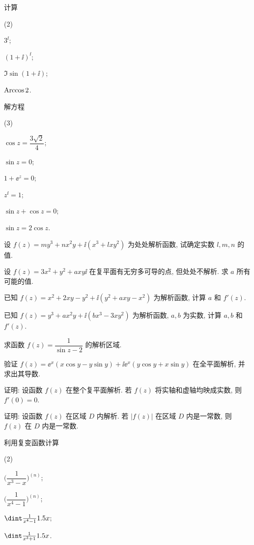 \begin{homework}
\begin{homework}
    \item 计算
      \begin{subhomework}(2)
        \item $3^\ii$;
        \item $(1+\ii)^\ii$;
        \item $\Im\sin(1+\ii)$;
        \item $\operatorname{Arccos} 2$.
      \end{subhomework}
    \item 解方程 
      \begin{subhomework}(3)
        \item $\cos z=\dfrac{3\sqrt2}4$;
        \item $\sin z=0$;
        \item $1+\ee^z=0$;
        \item $z^\ii=1$;
        \item $\sin z+\cos z=0$;
        \item $\sin z=2\cos z$.
      \end{subhomework}
    \item 设 $f(z)=my^3+nx^2y+\ii(x^3+lxy^2)$ 为处处解析函数, 试确定实数 $l,m,n$ 的值.
    \item 设 $f(z)=3x^2+y^2+axy\ii$ 在复平面有无穷多可导的点, 但处处不解析. 求 $a$ 所有可能的值.
    \item 已知 $f(z)=x^2+2xy-y^2+\ii(y^2+axy-x^2)$ 为解析函数, 计算 $a$ 和 $f'(z)$.
    \item 已知 $f(z)=y^3+ax^2y+\ii(bx^3-3xy^2)$ 为解析函数, $a,b$ 为实数, 计算 $a,b$ 和 $f'(z)$.  
    \item 求函数 $f(z)=\dfrac{1}{\sin z-2}$ 的解析区域.
    \item 验证 $f(z)=\ee^x(x\cos y-y\sin y)+\ii \ee^x(y\cos y+x\sin y)$ 在全平面解析, 并求出其导数.
    \item 证明: 设函数 $f(z)$ 在整个复平面解析. 若 $f(z)$ 将实轴和虚轴均映成实数, 则 $f'(0)=0$. 
    \item 证明: 设函数 $f(z)$ 在区域 $D$ 内解析. 若 $|f(z)|$ 在区域 $D$ 内是一常数, 则 $f(z)$ 在 $D$ 内是一常数.
    \item \optionalex 利用复变函数计算
      \begin{subhomework}[after-item-skip=3pt](2)
        \item $\biggl(\dfrac1{x^3-x}\biggr)^{(n)}$;
        \item $\biggl(\dfrac1{x^4-1}\biggr)^{(n)}$;
        \item $\dint \frac1{x^4-1}\d x$;
        \item $\dint \frac1{x^3+1}\d x$.

\end{subhomework}
\end{homework}
\end{homework}
